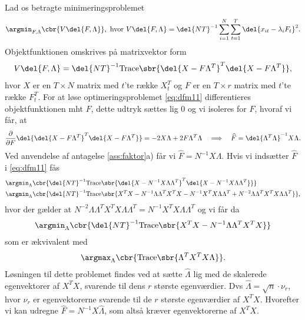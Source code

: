 Lad os betragte minimeringsproblemet
\begin{align}
\argmin_{F, \Lambda} \cbr{V \del{F, \Lambda}}, \text{ hvor } V \del{F, \Lambda} = \del{NT}^{-1} \sum_{i=1}^N \sum_{t=1}^T \del{x_{it} -\lambda_i F_t}^2.  \label{eq:dfm11}
\end{align}
Objektfunktionen omskrives på matrixvektor form
\begin{align*}
V \del{F, \Lambda} = \del{NT}^{-1} \text{Trace} \sbr{ \del{X - F \Lambda^T}^T \del{X - F \Lambda^T}},
\end{align*}
hvor \(X\) er en \(T \times N\) matrix med \(t\)'te række \(X_t^T\) og \(F\) er en \(T \times r\) matrix med \(t\)'te række \(F_t^T\).
For at løse optimeringsproblemet \eqref{eq:dfm11} differentieres objektfunktionen mht \(F\), dette udtryk sættes lig 0 og vi isoleres for \(F\), hvoraf vi får, at
\begin{align*}
\frac{\partial}{\partial F} \del{\del{X - F \Lambda^T}^T \del{X - F \Lambda^T}} = -2 X \Lambda + 2 F \Lambda^T \Lambda \quad \Longrightarrow \quad \widehat{F} = \del{\Lambda^T \Lambda}^{-1} X \Lambda.
\end{align*}
Ved anvendelse af antagelse \ref{ass:faktor}a) får vi  \(\widehat{F} = N^{-1} X \Lambda\).
Hvis vi indsætter \(\widehat{F}\) i \eqref{eq:dfm11} fås
\begin{align*}
&\argmin_\Lambda \cbr{\del{NT}^{-1} \text{Trace} \sbr{ \del{X - N^{-1} X \Lambda \Lambda^T}^T \del{X - N^{-1} X \Lambda \Lambda^T}}} \\
&\argmin_\Lambda \cbr{\del{NT}^{-1}  \text{Trace} \sbr{X^T X - N^{-1} \Lambda \Lambda^T X^T X - N^{-1} X^T X \Lambda \Lambda^T + N^{-2} \Lambda \Lambda^T X^T X \Lambda \Lambda^T}},
\end{align*}
hvor der gælder at \(N^{-2} \Lambda \Lambda^T X^T X \Lambda \Lambda^T = N^{-1} X^T X \Lambda \Lambda^T\) og vi får da
\begin{align*}
\argmin_\Lambda \cbr{\del{NT}^{-1} \text{Trace} \sbr{X^T X - N^{-1} \Lambda \Lambda^T X^T X}}
\end{align*}
som er ækvivalent med
\begin{align*}
\argmax_\Lambda \cbr{ \text{Trace} \sbr{\Lambda^T X^T X \Lambda}}.
\end{align*}
Løsningen til dette problemet findes ved at sætte \(\widehat{\Lambda}\) lig med de skalerede egenvektorer af \(X^T X\), svarende til dens \(r\) største egenværdier.
Dvs \(\hat{\Lambda} = \sqrt{n} \cdot \nu_r\), hvor \(\nu_r\) er egenvektorerne svarende til de \(r\) største egenværdier af \(X^T X\).
Hvorefter vi kan udregne \(\widehat{F} = N^{-1} X \widehat{\Lambda}\), som altså kræver egenvektorerne af \(X^T X\).

